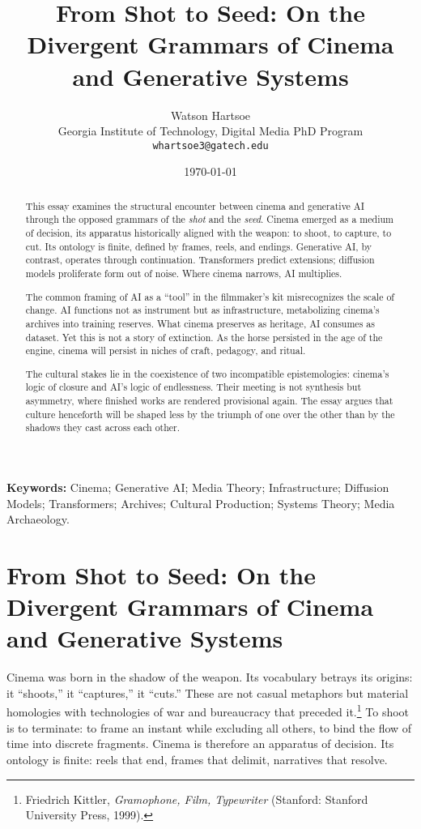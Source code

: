 \documentclass[11pt]{article}
\title{\textbf{From Shot to Seed: On the Divergent Grammars of Cinema and Generative Systems}}
\author{Watson Hartsoe\\
Georgia Institute of Technology, Digital Media PhD Program\\
\texttt{whartsoe3@gatech.edu}}
\date{\today}
\begin{document}
\maketitle

\begin{abstract}
This essay examines the structural encounter between cinema and generative AI through the opposed grammars of the \textit{shot} and the \textit{seed}. Cinema emerged as a medium of decision, its apparatus historically aligned with the weapon: to shoot, to capture, to cut. Its ontology is finite, defined by frames, reels, and endings. Generative AI, by contrast, operates through continuation. Transformers predict extensions; diffusion models proliferate form out of noise. Where cinema narrows, AI multiplies.

The common framing of AI as a ``tool'' in the filmmaker's kit misrecognizes the scale of change. AI functions not as instrument but as infrastructure, metabolizing cinema's archives into training reserves. What cinema preserves as heritage, AI consumes as dataset. Yet this is not a story of extinction. As the horse persisted in the age of the engine, cinema will persist in niches of craft, pedagogy, and ritual.

The cultural stakes lie in the coexistence of two incompatible epistemologies: cinema's logic of closure and AI's logic of endlessness. Their meeting is not synthesis but asymmetry, where finished works are rendered provisional again. The essay argues that culture henceforth will be shaped less by the triumph of one over the other than by the shadows they cast across each other.
\end{abstract}

\noindent\textbf{Keywords:} Cinema; Generative AI; Media Theory; Infrastructure; Diffusion Models; Transformers; Archives; Cultural Production; Systems Theory; Media Archaeology.

\vspace{1em}

\section*{From Shot to Seed: On the Divergent Grammars of Cinema and Generative Systems}

Cinema was born in the shadow of the weapon. Its vocabulary betrays its origins: it ``shoots,'' it ``captures,'' it ``cuts.'' These are not casual metaphors but material homologies with technologies of war and bureaucracy that preceded it.\footnote{Friedrich Kittler, \textit{Gramophone, Film, Typewriter} (Stanford: Stanford University Press, 1999).} To shoot is to terminate: to frame an instant while excluding all others, to bind the flow of time into discrete fragments. Cinema is therefore an apparatus of decision. Its ontology is finite: reels that end, frames that delimit, narratives that resolve.
\end{document}
